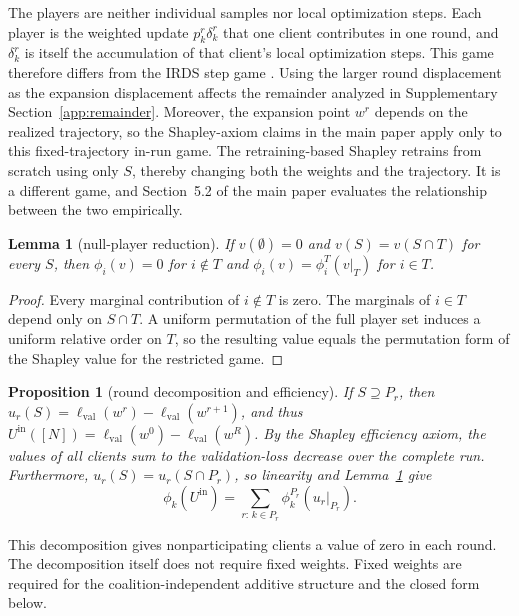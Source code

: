 \documentclass[letterpaper]{article} %
\theoremstyle{plain}
\newtheorem{proposition}{Proposition}
\newtheorem{lemma}{Lemma}
\newcommand{\lval}{\ell_{\mathrm{val}}}
\begin{document}
The players are neither individual samples nor local optimization steps. Each
player is the weighted update $p_k^r \delta_k^r$ that one client contributes in
one round, and $\delta_k^r$ is itself the accumulation of that client's local
optimization steps. This game therefore
differs from the IRDS step game \citep{wang2025data}. Using the larger round displacement as the
expansion displacement affects the remainder analyzed in Supplementary
Section~\ref{app:remainder}. Moreover, the expansion point $w^r$ depends on the
realized trajectory, so the Shapley-axiom claims in the main paper apply only
to this fixed-trajectory in-run game. The retraining-based Shapley \citep{ghorbani2019data}
retrains from scratch
using only $S$, thereby changing both the weights and the trajectory. It is a
different game, and Section~5.2 of the main paper evaluates the relationship
between the two empirically.

\begin{lemma}[null-player reduction]
\label{lem:null}
If $v(\emptyset) = 0$ and $v(S) = v(S \cap T)$ for every $S$, then
$\phi_i(v) = 0$ for $i \notin T$ and $\phi_i(v) = \phi_i^T(v|_T)$ for
$i \in T$.
\end{lemma}

\begin{proof}
Every marginal contribution of $i \notin T$ is zero. The marginals of
$i \in T$ depend only on $S \cap T$. A uniform permutation of the full player
set induces a uniform relative order on $T$, so the resulting value equals
the permutation form of the Shapley value for the restricted game.
\end{proof}

\begin{proposition}[round decomposition and efficiency]
\label{prop:decomp}
If $S \supseteq P_r$, then $u_r(S) = \lval(w^r) - \lval(w^{r+1})$, and thus
$U^{\mathrm{in}}([N]) = \lval(w^0) - \lval(w^R)$. By the Shapley efficiency
axiom, the values of all clients sum to the validation-loss decrease over the
complete run. Furthermore, $u_r(S) = u_r(S \cap P_r)$, so linearity and
Lemma~\ref{lem:null} give
\[
\phi_k(U^{\mathrm{in}}) = \sum_{r:\,k \in P_r} \phi_k^{P_r}(u_r|_{P_r}).
\]
\end{proposition}

This decomposition gives nonparticipating clients a value of zero in each
round. The decomposition itself does not require fixed weights. Fixed weights
are required for the coalition-independent additive structure and the closed
form below.
\end{document}
